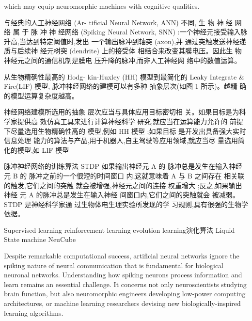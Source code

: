 
which may equip neuromorphic machines with cognitive qualities.

与经典的人工神经网络 (Ar-
tificial Neural Network, ANN) 不同, 生 物 神 经 网 络 属 于 脉 冲 神 经网络 (Spiking Neural Network,
SNN) :一个神经元接受输入脉
升高,当达到特定阈值时,发出
一个输出脉冲到轴突 (axon),并
通过突触发送神经递质与后续神
经元树突 (dendrite) 上的接受体
相结合来改变其膜电压。因此生
物神经元之间的通信机制是膜电
压升降的脉冲,而非人工神经网
络中的数值运算。

从生物精确性最高的 Hodg-
kin-Huxley (HH) 模型到最简化的
Leaky Integrate \& Fire(LIF) 模型,
脉冲神经网络的建模可以有多种
抽象层次(如图 1 所示)。越精
确的模型运算复杂度越高。

神经网络建模所选用的抽象
层次应当与具体应用目标密切相
关。如果目标是为科学家提供高
效仿真工具来进行计算神经科学
研究,就应当在运算能力允许的 
前提下尽量选用生物精确性高的
模型,例如 HH 模型 ;如果目标
是开发出具备强大实时信息处理
能力的算法与产品,用于机器人,自主驾驶等应用领域,就应当尽
量选用简化的模型,如 LIF 模型

脉冲神经网络的训练算法
STDP
如果输出神经元 A 的
脉冲总是发生在输入神经元 B 的
脉冲之前的一个很短的时间窗口
内,这就意味着 A 与 B 之间存在 
相关联的触发,它们之间的突触 
就会被增强,神经元之间的连接 
权重增大 ;反之,如果输出神经 
元 A 的脉冲总是发生在输入神经 
间窗口内,它们之间的突触就会 
被减弱。STDP 是神经科学家通
过生物体电生理实验所发现的学
习规则,具有很强的生物学依据。

Supervised learning
reinforcement learning
evolution learning演化算法
Liquid State machine
NeuCube

Despite remarkable computational success, artificial neural networks ignore the spiking nature of neural communication that is fundamental for biological neuronal networks. Understanding how spiking neurons process information and learn remains an essential challenge. It concerns not only neuroscientists studying brain function, but also neuromorphic engineers developing low-power computing architectures, or machine learning researchers devising new biologically-inspired learning algorithms. 





